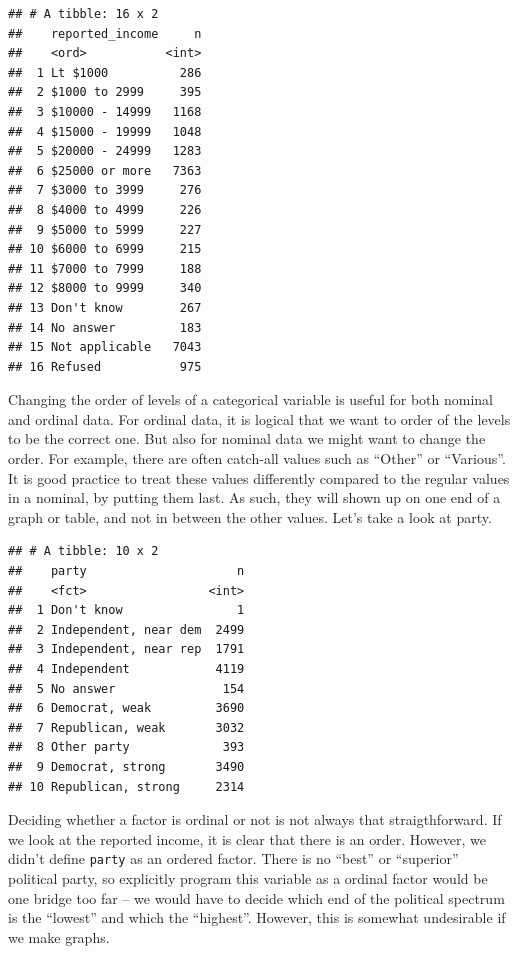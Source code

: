\documentclass[]{tufte-book}
\newenvironment{Shaded}{}{}
\newcommand{\KeywordTok}[1]{\textcolor[rgb]{0.00,0.44,0.13}{\textbf{#1}}}
\newcommand{\StringTok}[1]{\textcolor[rgb]{0.25,0.44,0.63}{#1}}
\newcommand{\OperatorTok}[1]{\textcolor[rgb]{0.40,0.40,0.40}{#1}}
\newcommand{\NormalTok}[1]{#1}
\begin{document}
\begin{verbatim}
## # A tibble: 16 x 2
##    reported_income     n
##    <ord>           <int>
##  1 Lt $1000          286
##  2 $1000 to 2999     395
##  3 $10000 - 14999   1168
##  4 $15000 - 19999   1048
##  5 $20000 - 24999   1283
##  6 $25000 or more   7363
##  7 $3000 to 3999     276
##  8 $4000 to 4999     226
##  9 $5000 to 5999     227
## 10 $6000 to 6999     215
## 11 $7000 to 7999     188
## 12 $8000 to 9999     340
## 13 Don't know        267
## 14 No answer         183
## 15 Not applicable   7043
## 16 Refused           975
\end{verbatim}

Changing the order of levels of a categorical variable is useful for
both nominal and ordinal data. For ordinal data, it is logical that we
want to order of the levels to be the correct one. But also for nominal
data we might want to change the order. For example, there are often
catch-all values such as ``Other'' or ``Various''. It is good practice
to treat these values differently compared to the regular values in a
nominal, by putting them last. As such, they will shown up on one end of
a graph or table, and not in between the other values. Let's take a look
at party.

\begin{Shaded}
\end{Shaded}

\begin{verbatim}
## # A tibble: 10 x 2
##    party                     n
##    <fct>                 <int>
##  1 Don't know                1
##  2 Independent, near dem  2499
##  3 Independent, near rep  1791
##  4 Independent            4119
##  5 No answer               154
##  6 Democrat, weak         3690
##  7 Republican, weak       3032
##  8 Other party             393
##  9 Democrat, strong       3490
## 10 Republican, strong     2314
\end{verbatim}

Deciding whether a factor is ordinal or not is not always that
straigthforward. If we look at the reported income, it is clear that
there is an order. However, we didn't define \texttt{party} as an
ordered factor. There is no ``best'' or ``superior'' political party, so
explicitly program this variable as a ordinal factor would be one bridge
too far -- we would have to decide which end of the political spectrum
is the ``lowest'' and which the ``highest''. However, this is somewhat
undesirable if we make graphs.
\end{document}
